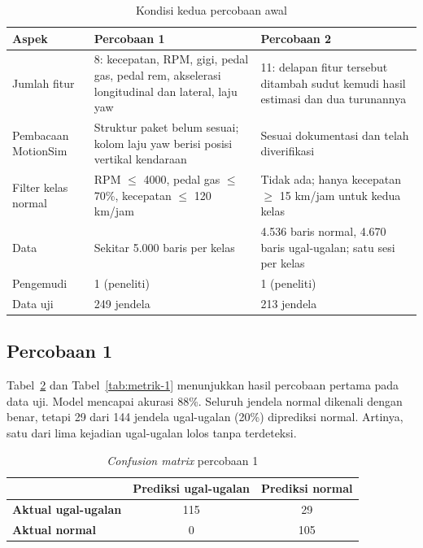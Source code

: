 \begin{table}[H]
  \centering
  \caption{Kondisi kedua percobaan awal}
  \label{tab:kondisi-percobaan}
  \small
  \begin{tabular}{|p{3.6cm}|p{5cm}|p{5cm}|}
    \hline
    \textbf{Aspek} & \textbf{Percobaan 1} & \textbf{Percobaan 2} \\
    \hline
    Jumlah fitur & 8: kecepatan, RPM, gigi, pedal gas, pedal rem, akselerasi longitudinal dan lateral, laju yaw & 11: delapan fitur tersebut ditambah sudut kemudi hasil estimasi dan dua turunannya \\
    \hline
    Pembacaan MotionSim & Struktur paket belum sesuai; kolom laju yaw berisi posisi vertikal kendaraan & Sesuai dokumentasi dan telah diverifikasi \\
    \hline
    Filter kelas normal & RPM $\le$ 4000, pedal gas $\le$ 70\%, kecepatan $\le$ 120 km/jam & Tidak ada; hanya kecepatan $\ge$ 15 km/jam untuk kedua kelas \\
    \hline
    Data & Sekitar 5.000 baris per kelas & 4.536 baris normal, 4.670 baris ugal-ugalan; satu sesi per kelas \\
    \hline
    Pengemudi & 1 (peneliti) & 1 (peneliti) \\
    \hline
    Data uji & 249 jendela & 213 jendela \\
    \hline
  \end{tabular}
\end{table}

\subsection{Percobaan 1}
Tabel~\ref{tab:cm-1} dan Tabel~\ref{tab:metrik-1} menunjukkan hasil percobaan pertama pada data uji. Model mencapai akurasi 88\%. Seluruh jendela normal dikenali dengan benar, tetapi 29 dari 144 jendela ugal-ugalan (20\%) diprediksi normal. Artinya, satu dari lima kejadian ugal-ugalan lolos tanpa terdeteksi.

\begin{table}[H]
  \centering
  \caption{\textit{Confusion matrix} percobaan 1}
  \label{tab:cm-1}
  \begin{tabular}{|l|c|c|}
    \hline
     & \textbf{Prediksi ugal-ugalan} & \textbf{Prediksi normal} \\
    \hline
    \textbf{Aktual ugal-ugalan} & 115 & 29 \\
    \hline
    \textbf{Aktual normal} & 0 & 105 \\
    \hline
  \end{tabular}
\end{table}

